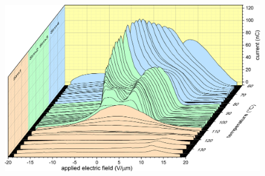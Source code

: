 \documentclass[superscriptaddress,floatfix,onecolumn,notitlepage]{revtex4-1}
\begin{document}
\begin{figure}[H]
    \centering
    \includegraphics[width=.9\textwidth]{polzv9.png}


\end{figure}
\end{document}
